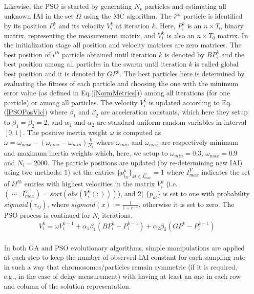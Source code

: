 Likewise, the PSO is started by generating $N_{p}$ particles and estimating all unknown IAI in the set $\bar{\Omega}$ using the MC algorithm. The $i^{th}$ particle is identified by its position $P^{k}_{i}$ and its velocity $V^{k}_{i}$ at iteration $k$. Here, $P^{k}_{i}$ is an $n \times T_{0}$ binary matrix, representing the measurement matrix, and $V^{k}_{i}$ is also an $n \times T_{0}$ matrix. In the initialization stage all position and velocity matrices are zero matrices. The best position of $i^{th}$ particle obtained until iteration $k$ is denoted by $BP_{i}^{k}$ and the best position among all particles in the swarm until iteration $k$ is called global best position and it is denoted by $GP^{k}$. The best particles here is determined by evaluating the fitness of each particle and choosing the one with the minimum error value (as defined in Eq.(\ref{NormMetrics})) among all iterations (for one particle) or among all particles. The velocity $V^{k}_{i}$ is  updated according to Eq.(\ref{PSOPosVlc}) where $\beta_{1}$ and $\beta_{2}$ are acceleration constants, which here they setup to $\beta_{1}=\beta_{2}=2$, and $\alpha_{1}$ and $\alpha_{2}$ are standard uniform random variables in interval $[0,1]$. The positive inertia weight $\omega$ is computed as  $\omega=\omega_{max}-(\omega_{max}-\omega_{min})\frac{k}{N_{i}}$ where $\omega_{min}$ and $\omega_{max}$ are respectively minimum and maximum inertia weights which, here, we setup to $\omega_{min}=0.3$, $\omega_{max}=0.9$ and $N_{i}=2000$. The particle positions are updated (by re-determining new IAI) using two methods: 1) set the entries $\{p^{k}_{i_{kl}}\}_{kl\in I^{V}_{max}}=1$ where $I^{V}_{max}$ indicates the set of $kl^{th}$ entries with highest velocities in the matrix $V^{k}_{i}$ (i.e. $(\sim,I^{V}_{max})=sort(abs(V^{k}_{i}(:)))$), and 2) $\{p_{kl}\}$ is set to one with probability $sigmoid(v_{ij})$, where $sigmoid(x):=\frac{1}{1+e^{-x}}$, otherwise it is set to zero. The PSO process is continued for $N_{i}$ iterations.
\begin{equation} \label{PSOPosVlc}
\begin{aligned}
V_{i}^{k} = \omega V_{i}^{k-1}+ \alpha_{1} \beta_{1} (BP_{i}^{k}-P_{i}^{k-1}) + \alpha_{2} \beta_{2} (GP^{k}-P_{i}^{k-1}) \\
\end{aligned}
\end{equation}

In both GA and PSO evolutionary algorithms, simple manipulations are applied at each step to keep the number of observed IAI constant for each sampling rate in such a way that chromosomes/particles remain symmetric (if it is required, e.g., in the case of delay measurement) with having at least an one in each row and column of the solution representation.
